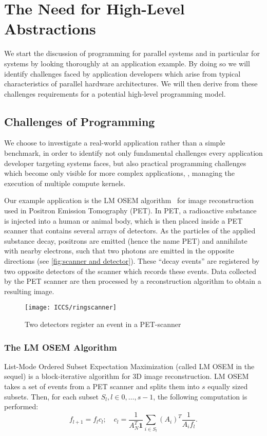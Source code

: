\section{The Need for High-Level Abstractions}
We start the discussion of programming for parallel systems and in particular for \GPU systems by looking thoroughly at an application example.
By doing so we will identify challenges faced by application developers which arise from typical characteristics of parallel hardware architectures.
We will then derive from these challenges requirements for a potential high-level programming model.


\subsection{Challenges of \GPU Programming}
\label{section:opencl-example}
We choose to investigate a real-world application rather than a simple benchmark, in order to identify not only fundamental challenges every application developer targeting \GPU systems faces, but also practical programming challenges which become only visible for more complex applications, \eg, managing the execution of multiple compute kernels.

Our example application is the LM OSEM algorithm~\cite{ReaderErFlOt1998, SchellmannGoMeKoScWuBu2009} for image reconstruction used in Positron Emission Tomography (PET).
In PET, a radioactive substance is injected into a human or animal body, which is then placed inside a PET scanner that contains several arrays of detectors.
As the particles of the applied substance decay, positrons are emitted (hence the name PET) and annihilate with nearby electrons, such that two photons are emitted in the opposite directions (see \autoref{fig:scanner and detector}).
These ``decay events'' are registered by two opposite detectors of the scanner which records these events.
Data collected by the PET scanner are then processed by a reconstruction algorithm to obtain a resulting image.

\begin{figure}
  \centering
  \texttt{[image: ICCS/ringscanner]}
  \caption{Two detectors register an event in a PET-scanner}
  \label{fig:scanner and detector}
\end{figure}

\subsubsection{The LM OSEM Algorithm}
List-Mode Ordered Subset Expectation Maximization \cite{ReaderErFlOt1998} (called LM OSEM in the sequel) is a block-iterative algorithm for 3D image reconstruction.
LM OSEM takes a set of events from a PET scanner and splits them into $s$ equally sized subsets.
Then, for each subset $S_l, l \in {0, \ldots, s-1}$, the following computation is performed:
\begin{equation}
  f_{l+1}=f_{l}c_{l};\quad c_{l}=\dfrac{1}{A_N^T \textbf{1}} \sum_{i \in S_{l}} (A_i)^T \dfrac{1}{A_{i} f_{l}}.
\label{equ:lm_osem}
\end{equation}

